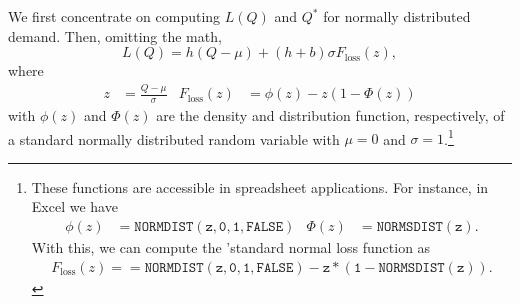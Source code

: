 We first concentrate on computing $L(Q)$ and $Q^*$ for normally distributed demand.  Then, omitting the math, 
\begin{equation*}
L(Q)  = h(Q-\mu) + (h+b) \sigma F_{\text{loss}}(z),
\end{equation*}
where 
\begin{align*}
z&=\frac{Q-\mu}{\sigma} & F_{\text{loss}}(z) &= \phi(z)-z(1-\Phi(z))
\end{align*}
with $\phi(z)$ and $\Phi(z)$ are the density and distribution function, respectively, of a standard normally distributed random variable with $\mu=0$ and $\sigma=1$.\footnote{These functions are accessible in spreadsheet applications. For instance, in Excel we have 
\begin{align*}
\phi(z) &=\mathtt{NORMDIST(z,0,1,FALSE)}
&
\Phi(z) &=\mathtt{NORMSDIST(z)}.
\end{align*}
With this, we can compute the 'standard normal loss function as
\begin{align*}
F_{\text{loss}}(z) = \mathtt{=NORMDIST(z,0,1,FALSE)-z*(1-NORMSDIST(z))}.
\end{align*}
}


